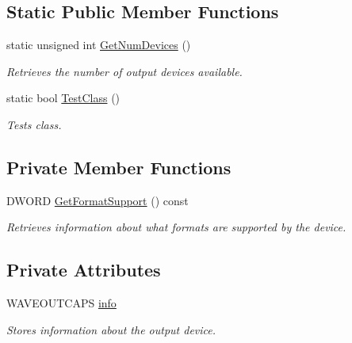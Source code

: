\subsection*{Static Public Member Functions}
\begin{DoxyCompactItemize}
\item 
static unsigned int \hyperlink{class_sound_device_output_a0ee9ec45f033786d21a968620d33827a}{GetNumDevices} ()
\begin{DoxyCompactList}\small\item\em Retrieves the number of output devices available. \item\end{DoxyCompactList}\item 
static bool \hyperlink{class_sound_device_output_afbf7c439b1783748207bb38796fb3458}{TestClass} ()
\begin{DoxyCompactList}\small\item\em Tests class. \item\end{DoxyCompactList}\end{DoxyCompactItemize}
\subsection*{Private Member Functions}
\begin{DoxyCompactItemize}
\item 
DWORD \hyperlink{class_sound_device_output_a99d193f58fc6ce7225da355577cc8b50}{GetFormatSupport} () const 
\begin{DoxyCompactList}\small\item\em Retrieves information about what formats are supported by the device. \item\end{DoxyCompactList}\end{DoxyCompactItemize}
\subsection*{Private Attributes}
\begin{DoxyCompactItemize}
\item 
\hypertarget{class_sound_device_output_a07cefc761af37048685dc52b45250597}{
WAVEOUTCAPS \hyperlink{class_sound_device_output_a07cefc761af37048685dc52b45250597}{info}}
\label{class_sound_device_output_a07cefc761af37048685dc52b45250597}

\begin{DoxyCompactList}\small\item\em Stores information about the output device. \item\end{DoxyCompactList}\end{DoxyCompactItemize}


